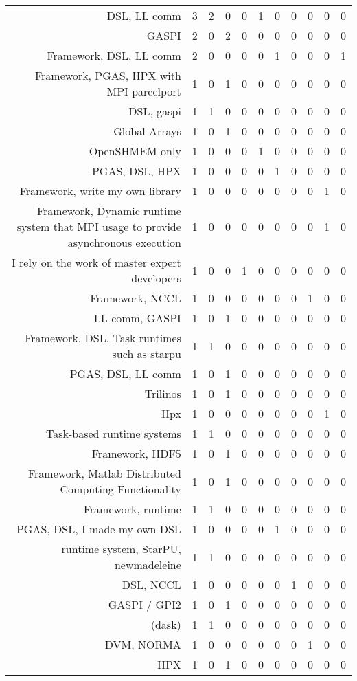 {\begin{landscape}
\begin{longtable}[htb]{r|c|c|c|c|c|c|c|c|c|c}
{DSL, LL comm} & 3 & 2 & 0 & 0 & 1 & 0 & 0 & 0 & 0 & 0 \\%
{GASPI} & 2 & 0 & 2 & 0 & 0 & 0 & 0 & 0 & 0 & 0 \\%
{Framework, DSL, LL comm} & 2 & 0 & 0 & 0 & 0 & 1 & 0 & 0 & 0 & 1 \\%
{Framework, PGAS, HPX with MPI parcelport} & 1 & 0 & 1 & 0 & 0 & 0 & 0 & 0 & 0 & 0 \\%
{DSL, gaspi} & 1 & 1 & 0 & 0 & 0 & 0 & 0 & 0 & 0 & 0 \\%
{Global Arrays} & 1 & 0 & 1 & 0 & 0 & 0 & 0 & 0 & 0 & 0 \\%
{OpenSHMEM only} & 1 & 0 & 0 & 0 & 1 & 0 & 0 & 0 & 0 & 0 \\%
{PGAS, DSL, HPX} & 1 & 0 & 0 & 0 & 0 & 1 & 0 & 0 & 0 & 0 \\%
{Framework, write my own library} & 1 & 0 & 0 & 0 & 0 & 0 & 0 & 0 & 1 & 0 \\%
{Framework, Dynamic runtime system that MPI usage to provide asynchronous execution} & 1 & 0 & 0 & 0 & 0 & 0 & 0 & 0 & 1 & 0 \\%
{I rely on the work of master expert developers} & 1 & 0 & 0 & 1 & 0 & 0 & 0 & 0 & 0 & 0 \\%
{Framework, NCCL} & 1 & 0 & 0 & 0 & 0 & 0 & 0 & 1 & 0 & 0 \\%
{LL comm, GASPI} & 1 & 0 & 1 & 0 & 0 & 0 & 0 & 0 & 0 & 0 \\%
{Framework, DSL, Task runtimes such as starpu} & 1 & 1 & 0 & 0 & 0 & 0 & 0 & 0 & 0 & 0 \\%
{PGAS, DSL, LL comm} & 1 & 0 & 1 & 0 & 0 & 0 & 0 & 0 & 0 & 0 \\%
{Trilinos} & 1 & 0 & 1 & 0 & 0 & 0 & 0 & 0 & 0 & 0 \\%
{Hpx} & 1 & 0 & 0 & 0 & 0 & 0 & 0 & 0 & 1 & 0 \\%
{Task-based runtime systems} & 1 & 1 & 0 & 0 & 0 & 0 & 0 & 0 & 0 & 0 \\%
{Framework, HDF5} & 1 & 0 & 1 & 0 & 0 & 0 & 0 & 0 & 0 & 0 \\%
{Framework, Matlab Distributed Computing Functionality} & 1 & 0 & 1 & 0 & 0 & 0 & 0 & 0 & 0 & 0 \\%
{Framework, runtime} & 1 & 1 & 0 & 0 & 0 & 0 & 0 & 0 & 0 & 0 \\%
{PGAS, DSL, I made my own DSL} & 1 & 0 & 0 & 0 & 0 & 1 & 0 & 0 & 0 & 0 \\%
{runtime system, StarPU, newmadeleine} & 1 & 1 & 0 & 0 & 0 & 0 & 0 & 0 & 0 & 0 \\%
{DSL, NCCL} & 1 & 0 & 0 & 0 & 0 & 0 & 1 & 0 & 0 & 0 \\%
{GASPI / GPI2} & 1 & 0 & 1 & 0 & 0 & 0 & 0 & 0 & 0 & 0 \\%
{(dask)} & 1 & 1 & 0 & 0 & 0 & 0 & 0 & 0 & 0 & 0 \\%
{DVM, NORMA} & 1 & 0 & 0 & 0 & 0 & 0 & 0 & 1 & 0 & 0 \\%
{HPX} & 1 & 0 & 1 & 0 & 0 & 0 & 0 & 0 & 0 & 0 \\%
\hline%
\end{longtable}%
\end{landscape}}%
\clearpage%
